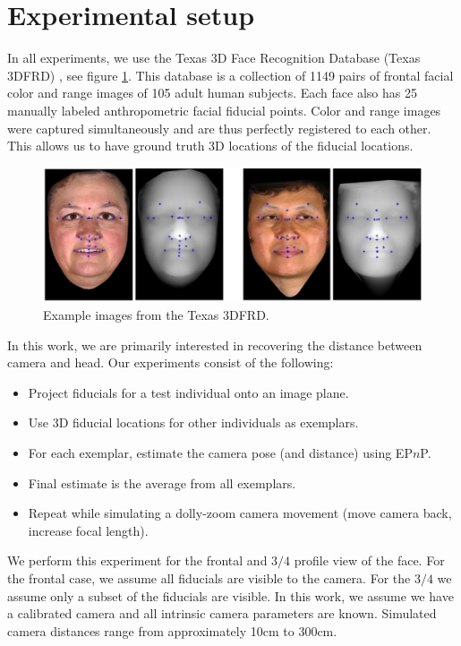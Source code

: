 \documentclass[runningheads]{llncs}
\newcommand {\EPnP} {EP$n$P}
\begin{document}
\section{Experimental setup}
In all experiments, we use the Texas 3D Face Recognition Database (Texas 3DFRD) \cite{gupta2010texas}, see figure \ref{fig:t3dfrd}.  
This database is a collection of 1149 pairs of frontal facial color and range images of 105 adult human subjects.  
Each face also has 25 manually labeled anthropometric facial fiducial points.  
Color and range images were captured simultaneously and are thus perfectly registered to each other.  
This allows us to have ground truth 3D locations of the fiducial locations.  
\begin{figure}[h]
\centering
\includegraphics[width=.7\linewidth]{resources/figures/t3dfr.jpg}
\caption{Example images from the Texas 3DFRD.}
\label{fig:t3dfrd}
\end{figure}
In this work, we are primarily interested in recovering the distance between camera and head.  Our experiments consist of the following:

\begin{itemize}
\item Project fiducials for a test individual onto an image plane.
\item Use 3D fiducial locations for other individuals as exemplars.
\item For each exemplar, estimate the camera pose (and distance) using \EPnP.
\item Final estimate is the average from all exemplars.
\item Repeat while simulating a dolly-zoom camera movement (move camera back, increase focal length).  
\end{itemize}

We perform this experiment for the frontal and $3/4$ profile view of the face.  
For the frontal case, we assume all fiducials are visible to the camera.  
For the $3/4$ we assume only a subset of the fiducials are visible. 
In this work, we assume we have a calibrated camera and all intrinsic camera parameters are known.  
Simulated camera distances range from approximately 10cm to 300cm.
\end{document}
